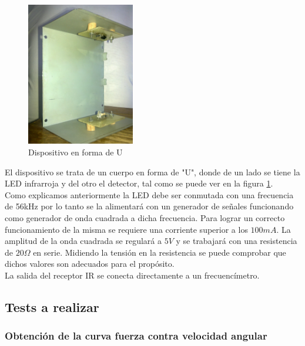 \documentclass[spanish,12pt,a4paper,titlepage]{report}
\begin{document}
\begin{figure}
  \vspace{-20pt}
  \begin{center}
    \includegraphics[width=0.42\textwidth]{./Pics/u.jpg}
  \end{center}
  \vspace{-20pt}
  \caption{Dispositivo en forma de U}
  \label{fig:u}
  \vspace{-10pt}
\end{figure}

El dispositivo se trata de un cuerpo en forma de "U", donde de un lado se tiene la LED infrarroja y del otro el detector, tal como se puede ver en la figura \ref{fig:u}.\\

Como explicamos anteriormente la LED debe ser conmutada con una frecuencia de 56kHz por lo tanto se la alimentará con un generador de señales funcionando como generador de onda cuadrada a dicha frecuencia. Para lograr un correcto funcionamiento de la misma se requiere una corriente superior a los $100mA$. La amplitud de la onda cuadrada se regulará a $5V$ y se trabajará con una resistencia de $20\Omega$ en serie. Midiendo la tensión en la resistencia se puede comprobar que dichos valores son adecuados para el propósito.\\

La salida del receptor IR se conecta directamente a un frecuencímetro.\\

\subsection{Tests a realizar}

\subsubsection*{Obtención de la curva fuerza contra velocidad angular}
\end{document}
